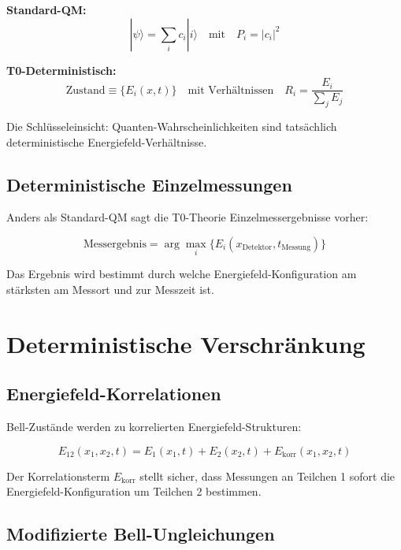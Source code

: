 \documentclass[12pt,a4paper]{report}
\begin{document}
\textbf{Standard-QM:}
\begin{equation}
	|\psi\rangle = \sum_i c_i |i\rangle \quad \text{mit} \quad P_i = |c_i|^2
\end{equation}

\textbf{T0-Deterministisch:}
\begin{equation}
	\text{Zustand} \equiv \{E_i(x,t)\} \quad \text{mit Verhältnissen} \quad R_i = \frac{E_i}{\sum_j E_j}
\end{equation}

Die Schlüsseleinsicht: Quanten-Wahrscheinlichkeiten sind tatsächlich deterministische Energiefeld-Verhältnisse.

\subsection{Deterministische Einzelmessungen}
\label{subsec:deterministic_measurements}

Anders als Standard-QM sagt die T0-Theorie Einzelmessergebnisse vorher:

\begin{equation}
	\text{Messergebnis} = \arg\max_i\{E_i(x_{\text{Detektor}}, t_{\text{Messung}})\}
\end{equation}

Das Ergebnis wird bestimmt durch welche Energiefeld-Konfiguration am stärksten am Messort und zur Messzeit ist.

\section{Deterministische Verschränkung}
\label{sec:deterministic_entanglement}

\subsection{Energiefeld-Korrelationen}
\label{subsec:energy_field_correlations}

Bell-Zustände werden zu korrelierten Energiefeld-Strukturen:

\begin{equation}
	E_{12}(x_1,x_2,t) = E_1(x_1,t) + E_2(x_2,t) + E_{\text{korr}}(x_1,x_2,t)
\end{equation}

Der Korrelationsterm $E_{\text{korr}}$ stellt sicher, dass Messungen an Teilchen 1 sofort die Energiefeld-Konfiguration um Teilchen 2 bestimmen.

\subsection{Modifizierte Bell-Ungleichungen}
\label{subsec:modified_bell_inequalities}
\end{document}
